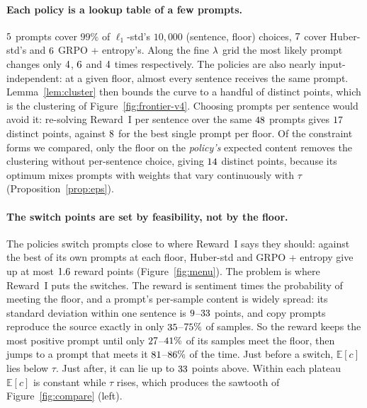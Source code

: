 \paragraph{Each policy is a lookup table of a few prompts.}
$5$ prompts cover $99\%$ of $\ell_1$-std's $10{,}000$
(sentence, floor) choices, $7$ cover Huber-std's and
$6$ GRPO + entropy's. Along the fine $\lambda$ grid the most likely
prompt changes only $4$, $6$ and $4$
times respectively. The policies are also nearly input-independent: at a given
floor, almost every sentence receives the same prompt. Lemma~\ref{lem:cluster}
then bounds the curve to a handful of distinct points, which is the clustering
of Figure~\ref{fig:frontier-v4}. Choosing prompts per sentence would avoid it:
re-solving Reward~I per sentence over the same $48$ prompts gives
$17$ distinct points, against $8$ for the best
single prompt per floor. Of the constraint forms we compared, only the floor on
the \emph{policy's} expected content removes the clustering without
per-sentence choice, giving $14$ distinct points, because its
optimum mixes prompts with weights that vary continuously with $\tau$
(Proposition~\ref{prop:eps}).

\paragraph{The switch points are set by feasibility, not by the floor.}
The policies switch prompts close to where Reward~I says they should: against
the best of its own prompts at each floor, Huber-std and GRPO + entropy give up
at most $1.6$ reward points (Figure~\ref{fig:menu}). The problem
is where Reward~I puts the switches. The reward is sentiment times the
probability of meeting the floor, and a prompt's per-sample content is widely
spread: its standard deviation within one sentence is $9$--$33$
points, and copy prompts reproduce the source exactly in only
$35$--$75\%$ of samples. So the reward keeps the most
positive prompt until only $27$--$41\%$ of its samples
meet the floor, then jumps to a prompt that meets it
$81$--$86\%$ of the time. Just before a switch, $\mathbb{E}[c]$
lies below $\tau$. Just after, it can lie up to $33$ points above. Within each
plateau $\mathbb{E}[c]$ is constant while $\tau$ rises, which produces the
sawtooth of Figure~\ref{fig:compare} (left).

